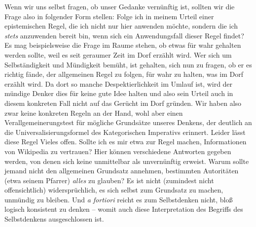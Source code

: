Wenn wir uns selbst fragen, ob unser Gedanke vernünftig
ist, sollten wir die Frage also in folgender Form stellen: Folge ich in meinem
Urteil einer epistemischen Regel, die ich nicht nur hier anwenden möchte,
sondern die ich \emph{stets} anzuwenden bereit bin, wenn sich ein Anwendungsfall
dieser Regel findet? Es mag beispielsweise die Frage im Raume
stehen, ob etwas für wahr gehalten werden sollte, weil es seit geraumer Zeit im
Dorf erzählt wird. Wer sich um Selbständigkeit und Mündigkeit bemüht, ist
gehalten, sich nun zu fragen, ob er es richtig fände, der allgemeinen Regel zu
folgen, für wahr zu halten, was im Dorf erzählt wird. Da dort so manche
Despektierlichkeit im Umlauf ist, wird der mündige Denker dies für keine gute
Idee halten und also sein Urteil auch in diesem konkreten Fall nicht auf das
Gerücht im Dorf gründen. Wir haben also zwar keine konkreten Regeln an der Hand,
wohl aber einen Verallgemeinerungstest für mögliche Grundsätze unseres Denkens,
der deutlich an die Universalisierungsformel des Kategorischen Imperativs
erinnert. Leider lässt diese Regel Vieles offen. Sollte ich es mir etwa zur
Regel machen, Informationen von Wikipedia zu vertrauen? Hier können verschiedene
Antworten gegeben werden, von denen sich keine unmittelbar als unvernünftig
erweist. Warum sollte jemand nicht den allgemeinen Grundsatz annehmen,
bestimmten Autoritäten (etwa seinem Pfarrer) \emph{alles} zu glauben? Es ist
nicht (zumindest nicht offensichtlich) widersprüchlich, es sich selbst zum
Grundsatz zu machen, unmündig zu bleiben. Und \emph{a fortiori} reicht es zum
Selbstdenken nicht, bloß logisch konsistent zu denken -- womit auch diese
Interpretation des  Begriffs des Selbstdenkens ausgeschlossen ist.

